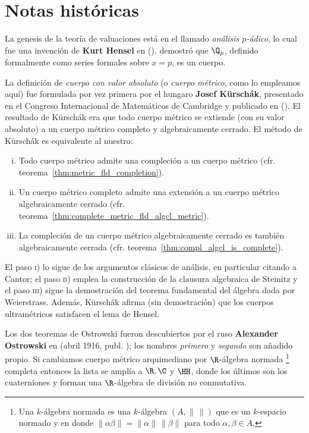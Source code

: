 \documentclass[teoria-numeros.tex]{subfiles}
\begin{document}
\section*{Notas históricas}
La genesis de la teoría de valuaciones está en el llamado \textit{análisis $p$-ádico}, lo cual fue una invención de \textbf{Kurt Hensel}
en \cite{hensel:begrundung} (\citeyear{hensel:begrundung}).
\citet{hensel:arithmetik} demostró que $\Q_p$, definido formalmente como series formales sobre $x = p$, es un cuerpo.

La definición de \textit{cuerpo con valor absoluto} (o \textit{cuerpo métrico}, como lo empleamos aquí) fue formulada por vez primera por
el hungaro \textbf{Josef Kürschák}, presentado en el Congreso Internacional de Matemáticos de Cambridge y publicado en \cite{kurschak:korpertheorie}
(\citeyear{kurschak:korpertheorie}).
El resultado de Kürschák era que todo cuerpo métrico se extiende (con su valor absoluto) a un cuerpo métrico completo y algebraicamente cerrado.
El método de Kürschák es equivalente al nuestro:
\begin{enumerate}[i)]
	\item Todo cuerpo métrico admite una compleción a un cuerpo métrico (cfr. teorema~\ref{thm:metric_fld_completion}).
	\item Un cuerpo métrico completo admite una extensión a un cuerpo métrico algebraicamente cerrado
		(cfr. teorema~\ref{thm:complete_metric_fld_algcl_metric}).
	\item La compleción de un cuerpo métrico algebraicamente cerrado es también algebraicamente cerrada
		(cfr. teorema~\ref{thm:compl_algcl_is_complete}).
\end{enumerate}
El paso \textsc{i)} lo sigue de los argumentos clásicos de análisis, en particular citando a Cantor; el paso \textsc{ii)} emplea la construcción de la clausura
algebraica de Steinitz y el paso \textsc{iii)} sigue la demostración del teorema fundamental del álgebra dada por Weierstrass.
Además, Kürschák afirma (sin demostración) que los cuerpos ultramétricos satisfacen el lema de Hensel.

Los dos teoremas de Ostrowski fueron descubiertos por el ruso \textbf{Alexander Ostrowski} en \cite{ostrowski:funktionalgleichung}
(abril 1916, publ. \citeyear{ostrowski:funktionalgleichung}); los nombres \textit{primero} y \textit{segundo} son añadido propio.
Si cambiamos cuerpo métrico arquimediano por $\R$-álgebra normada%
\footnote{Una $k$-álgebra normada es una $k$-álgebra $(A, \|\,\|)$ que es un $k$-espacio normado
y en donde $\|\alpha\beta\| = \|\alpha\|\,\|\beta\|$ para todo $\alpha, \beta\in A$.}
completa entonces la lista se amplía a $\R, \C$ y $\HH$, donde los últimos son los cuaterniones y forman una $\R$-álgebra de división no conmutativa.
\end{document}
